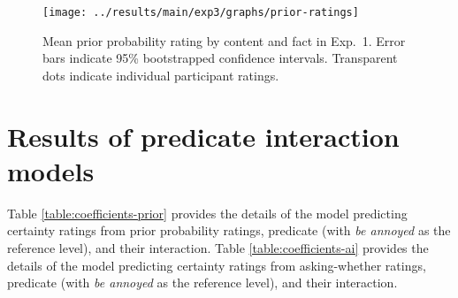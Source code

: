 \documentclass[11pt,fleqn]{article}
\newcommand{\6}{\mbox{$[\hspace*{-.6mm}[$}}
\newcommand{\9}{\mbox{$]\hspace*{-.6mm}]$}}
\begin{document}
\begin{figure}[h!]
\centering
\texttt{[image: ../results/main/exp3/graphs/prior-ratings]}

\caption{Mean prior probability rating by content and fact in Exp.~1. Error bars indicate 95\% bootstrapped confidence intervals. Transparent dots indicate individual participant ratings.} 
\label{f-prior}
\end{figure}


\section{Results of predicate interaction models}\label{a-models}

Table \ref{table:coefficients-prior} provides the details of the model predicting certainty ratings from prior probability ratings, predicate (with {\em be annoyed} as the reference level), and their interaction. Table \ref{table:coefficients-ai} provides the details of the model predicting certainty ratings from asking-whether ratings, predicate (with {\em be annoyed} as the reference level), and their interaction. 
\end{document}
